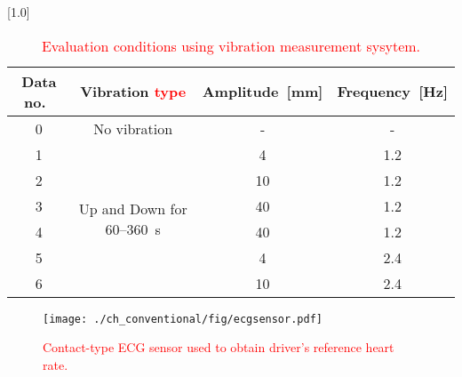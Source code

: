 \begin{table}[tb]
  \caption{\textcolor{red}{Evaluation conditions using vibration measurement sysytem.}}
  \centering
  \scalebox{1.0}[1.0]{
  \begin{tabular}{|c|c|c|c|} \hline
    Data no.~ & Vibration \textcolor{red}{type} & Amplitude~[mm] & Frequency~[Hz] \\ \hline \hline
    0 & No vibration & - & - \\ \hline
    1 & \multirow{6}{*}{Up and Down for 60--360~s} & 4 & 1.2  \\ \cline{1-1} \cline{3-4}
    2 & & 10 & 1.2 \\ \cline{1-1} \cline{3-4}
    3 & & 40 & 1.2 \\ \cline{1-1} \cline{3-4}
    4 & & 40 & 1.2 \\ \cline{1-1} \cline{3-4}
    5 & & 4 & 2.4 \\ \cline{1-1} \cline{3-4}
    6 & & 10 & 2.4 \\ \hline
  \end{tabular}
  }
  \label{tab:vibevacondition}
\end{table}


\begin{figure}[tb]
\centering
\texttt{[image: ./ch\_conventional/fig/ecgsensor.pdf]}
\caption{\textcolor{red}{Contact\textcolor{red}{-type} ECG sensor \cite{bioharness} \textcolor{red}{used to obtain driver's reference heart rate}.}}
\label{fig:ecgsensor}
\end{figure}

